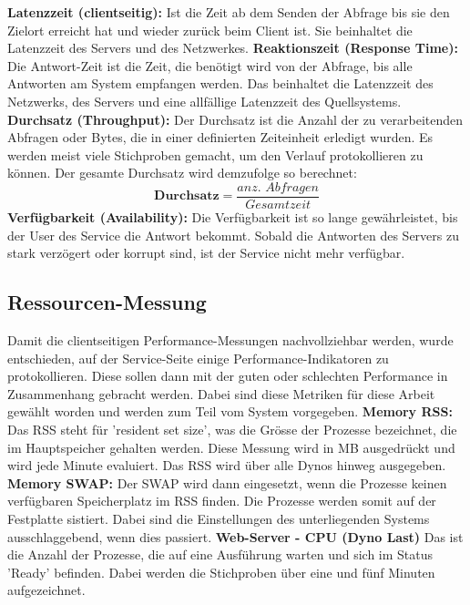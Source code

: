 \documentclass[main.tex]{subfiles}
\begin{document}
\textbf{Latenzzeit (clientseitig):} Ist die Zeit ab dem Senden der Abfrage bis sie den Zielort erreicht hat und wieder zurück beim Client ist. Sie beinhaltet die Latenzzeit des Servers und des Netzwerkes. 
\newline
\noindent
\textbf{Reaktionszeit (Response Time):} Die Antwort-Zeit ist die Zeit, die benötigt wird von der Abfrage, bis alle Antworten am System empfangen werden. Das beinhaltet die Latenzzeit des Netzwerks, des Servers und eine allfällige Latenzzeit des Quellsystems.
\newline
\noindent
\textbf{Durchsatz (Throughput):} Der Durchsatz ist die Anzahl der zu verarbeitenden Abfragen oder Bytes, die in einer definierten Zeiteinheit erledigt wurden. Es werden meist viele Stichproben gemacht, um den Verlauf protokollieren zu können\cite[Kap.~4]{Halili:2008:AJ:1481606}. Der gesamte Durchsatz wird demzufolge so berechnet:
\begin{equation}
\textbf{Durchsatz} = \frac{\textit{anz. Abfragen}}{\textit{Gesamtzeit}}
\end{equation}
\newline
\noindent
\textbf{Verfügbarkeit (Availability):} Die Verfügbarkeit ist so lange gewährleistet, bis der User des Service die Antwort bekommt. Sobald die Antworten des Servers zu stark verzögert oder korrupt sind, ist der Service nicht mehr verfügbar. 






\subsection{Ressourcen-Messung}
Damit die clientseitigen Performance-Messungen nachvollziehbar werden, wurde entschieden, auf der Service-Seite einige Performance-Indikatoren zu protokollieren. Diese sollen dann mit der guten oder schlechten Performance in Zusammenhang gebracht werden. Dabei sind diese Metriken für diese Arbeit gewählt worden und werden zum Teil vom System vorgegeben.
\newline
\noindent
\textbf{Memory RSS:} Das RSS steht für 'resident set size', was die Grösse der Prozesse bezeichnet, die im Hauptspeicher gehalten werden. Diese Messung wird in MB ausgedrückt und wird jede Minute evaluiert. Das RSS wird über alle Dynos hinweg ausgegeben.
\newline
\noindent
\textbf{Memory SWAP:} Der SWAP wird dann eingesetzt, wenn die Prozesse keinen verfügbaren Speicherplatz im RSS finden. Die Prozesse werden somit auf der Festplatte sistiert. Dabei sind die Einstellungen des unterliegenden Systems ausschlaggebend, wenn dies passiert.
\newline
\noindent
\textbf{Web-Server - CPU (Dyno Last) } Das ist die Anzahl der Prozesse, die auf eine Ausführung warten und sich im Status ’Ready’ befinden. Dabei werden die Stichproben über eine und fünf Minuten aufgezeichnet.
\end{document}
